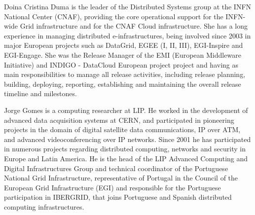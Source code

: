 \documentclass[journal]{IEEEtran}
\begin{document}
\begin{IEEEbiography}{Doina Cristina Duma}
is the leader of the Distributed Systems group at the INFN National Center (CNAF), providing the core operational support for the INFN-wide Grid infrastructure and for the CNAF Cloud infrastructure. She has a long experience in managing distributed e-infrastructures, being involved since 2003 in major European projects such as DataGrid, EGEE (I, II, III), EGI-Inspire and EGI-Engage. She was the Release Manager of the EMI (European Middleware Initiative) and INDIGO - DataCloud European project project and having as main responsibilities to manage all release activities, including release planning, building, deploying, reporting, establishing and maintaining the overall release timeline and milestones.
\end{IEEEbiography}

\begin{IEEEbiography}{Jorge Gomes}
is a computing researcher at LIP. He worked in the development of advanced data acquisition systems at CERN, and participated in pioneering projects in the domain of digital satellite data communications, IP over ATM, and advanced videoconferencing over IP networks. Since 2001 he has participated in numerous projects regarding distributed computing, networks and security in Europe and Latin America. He is the head of the LIP Advanced Computing and Digital Infrastructures Group and technical coordinator of the Portuguese National Grid Infrastructure, representative of Portugal in the Council of the European Grid Infrastructure (EGI) and responsible for the Portuguese participation in IBERGRID, that joins Portuguese and Spanish distributed computing infrastructures.
\end{IEEEbiography}
\end{document}
